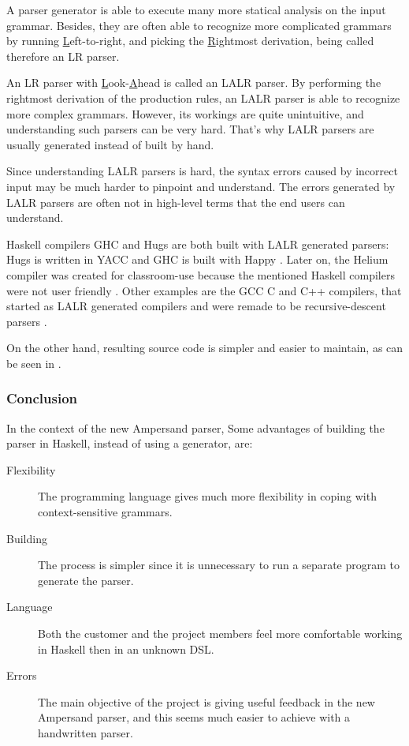 %
A parser generator is able to execute many more statical analysis on the input grammar.
Besides, they are often able to recognize more complicated grammars by running \underline{L}eft-to-right, and picking the \underline{R}ightmost derivation, being called therefore an LR parser.

%
An LR parser with \underline{L}ook-\underline{A}head is called an LALR parser.
By performing the rightmost derivation of the production rules, an LALR parser is able to recognize more complex grammars.
However, its workings are quite unintuitive, and understanding such parsers can be very hard.
That's why LALR parsers are usually generated instead of built by hand.

Since understanding LALR parsers is hard, the syntax errors caused by incorrect input may be much harder to pinpoint and understand.
The errors generated by LALR parsers are often not in high-level terms that the end users can understand.

%
%
%
%
%
Haskell compilers GHC and Hugs are both built with LALR generated parsers: Hugs is written in YACC \cite{hugs-parser} and GHC is built with Happy \cite{ghc-parser}.
Later on, the Helium compiler was created for classroom-use because the mentioned Haskell compilers were not user friendly \cite{helium-parser}.
Other examples are the GCC C and C++ compilers, that started as LALR generated compilers and were remade to be recursive-descent parsers \cite{gcc-c-parser} \cite{gcc-cpp-parser}.

On the other hand, resulting source code is simpler and easier to maintain, as can be seen in \cite{parser-examples}.

\subsubsection{Conclusion}
In the context of the new Ampersand parser, Some advantages of building the parser in Haskell, instead of using a generator, are:
\begin{description}
	\item[Flexibility] The programming language gives much more flexibility in coping with context-sensitive grammars.
	\item[Building] The process is simpler since it is unnecessary to run a separate program to generate the parser.
	\item[Language] Both the customer and the project members feel more comfortable working in Haskell then in an unknown DSL.
	\item[Errors] The main objective of the project is giving useful feedback in the new Ampersand parser, and this seems much easier to achieve with a handwritten parser.
\end{description}

